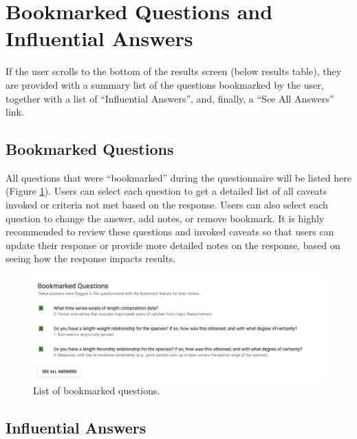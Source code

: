 \documentclass[
  11pt,
]{book}
\begin{document}
\hypertarget{bookmarked-questions-and-influential-answers}{%
\section{Bookmarked Questions and Influential Answers}\label{bookmarked-questions-and-influential-answers}}

If the user scrolls to the bottom of the results screen (below results table), they are provided with a summary list of the questions bookmarked by the user, together with a list of ``Influential Answers'', and, finally, a ``See All Answers'' link.

\hypertarget{bookmarked-questions}{%
\subsection{Bookmarked Questions}\label{bookmarked-questions}}

All questions that were ``bookmarked'' during the questionnaire will be listed here (Figure \ref{fig:flagged-questions}). Users can select each question to get a detailed list of all caveats invoked or criteria not met based on the response. Users can also select each question to change the answer, add notes, or remove bookmark. It is highly recommended to review these questions and invoked caveats so that users can update their response or provide more detailed notes on the response, based on seeing how the response impacts results.

\begin{figure}

{\centering \includegraphics[width=0.95\linewidth]{images/flagged-questions} 

}

\caption{List of bookmarked questions.}\label{fig:flagged-questions}
\end{figure}

\hypertarget{influential-answers}{%
\subsection{Influential Answers}\label{influential-answers}}
\end{document}

